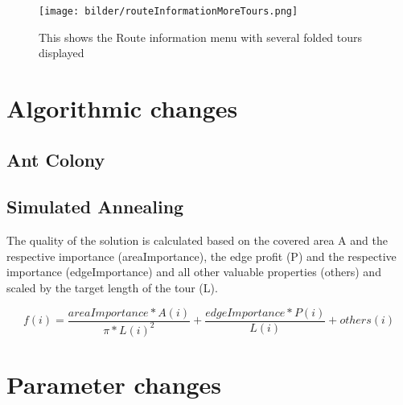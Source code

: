 \begin{figure}[H]
	\centering
	\texttt{[image: bilder/routeInformationMoreTours.png]}
	\caption{This shows the Route information menu with several folded tours displayed}
	\label{fig:actualFrontendToureInfoMenuMoreTours}
\end{figure}


\section{Algorithmic changes}
\label{sec:algorithmicChanges}

\subsection{Ant Colony}
\label{subsec:antColonyImplementation}


\subsection{Simulated Annealing}
\label{subsec:simulatedAnnealingImplementation}




The quality of the solution is calculated based on the covered area A and the respective importance (areaImportance), the edge profit (P) and the respective importance (edgeImportance) and all other valuable properties (others) and scaled by the target length of the tour (L). 

\begin{equation}\label{eq:qualitySA}
	f(i) = \frac{areaImportance * A(i)}{\pi * L(i)^2} + \frac{edgeImportance * P(i)}{L(i)} + others(i)
\end{equation}


\section{Parameter changes}
\label{sec:parameterChanges}

